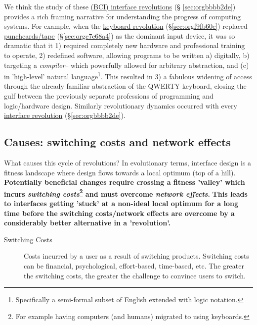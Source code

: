 \documentclass[logo,bsc,singlespacing,parskip]{infthesis}
\begin{document}
We think the study of these \hyperref[sec:orgbbbb2de]{(BCI) interface revolutions} (§  \ref{sec:orgbbbb2de}) provides a rich framing narrative for understanding the progress of computing systems.
For example, when the \hyperref[sec:orgf9fb60e]{keyboard revolution} (\S \ref{sec:orgf9fb60e}) replaced  \hyperref[sec:orgc7c68a4]{punchcards/tape} (\S \ref{sec:orgc7c68a4}) as the dominant input device, it was so dramatic that it 1) required completely new hardware and professional training to operate, 2) redefined software, allowing programs to be written a) digitally, b) targeting a \emph{compiler}-- which powerfully allowed for arbitrary abstraction, and (c) in 'high-level' natural language\footnote{Specifically a semi-formal subset of English extended with logic notation.}. This resulted in 3) a fabulous widening of access through the already familiar abstraction of the QWERTY keyboard, closing the gulf between the previously separate professions of programming and logic/hardware design.
Similarly revolutionary dynamics occurred with every \hyperref[sec:orgbbbb2de]{interface revolution} (\S \ref{sec:orgbbbb2de}).
\subsection{Causes: switching costs and network effects}
\label{sec:org61d0814}
What causes this cycle of revolutions?
In evolutionary terms, interface design is a fitness landscape where design flows towards a local optimum (top of a hill).
\textbf{Potentially beneficial changes require crossing a fitness 'valley' which incurs \emph{switching costs}\footnote{For example having computers (and humans) migrated to using keyboards.} and must overcome \emph{network effects}.}
\textbf{This leads to interfaces getting 'stuck' at a non-ideal local optimum for a long time before the switching costs/network effects are overcome by a considerably better alternative in a 'revolution'.}

\begin{mdframed}
\begin{description}
\item[{Switching Costs\label{switching costs}}] Costs incurred by a user as a result of switching products.
Switching costs can be financial, psychological, effort-based, time-based, etc.
The greater the switching costs, the greater the challenge to convince users to switch.
\end{description}
\end{mdframed}
\end{document}
